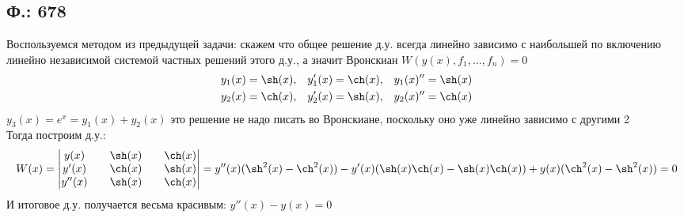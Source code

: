 \documentclass{article}
\begin{document}
\subsection{Ф.: 678}
Воспользуемся методом из предыдущей задачи: скажем что общее решение д.у. всегда линейно зависимо с наибольшей по включению линейно независимой системой частных решений этого д.у., а значит Вронскиан $W(y(x),f_1,\ldots, f_n)=0$
\begin{align*}
    &y_1(x)=\sh(x), &y_1'(x)=\ch(x), &&y_1(x)''=\sh(x) \\
    &y_2(x)=\ch(x), &y_2'(x)=\sh(x), &&y_2(x)''=\ch(x) 
\end{align*}
$y_3(x)=e^x=y_1(x)+y_2(x)$ это решение не надо писать во Вронскиане, поскольку оно уже линейно зависимо с другими 2\\
Тогда построим д.у.:
\begin{equation}
    W(x)
    =
    \begin{vmatrix}
     y(x) && \sh(x) && \ch(x)\\
     y'(x) && \ch(x) && \sh(x)\\
     y''(x) && \sh(x) && \ch(x)\\
    \end{vmatrix}
    =y''(x) (\sh^2(x)-\ch^2(x)) - y'(x) (\sh(x)\ch(x)-\sh(x)\ch(x)) + y(x) (\ch^2(x)-\sh^2(x))
    =0
\end{equation}
И итоговое д.у. получается весьма красивым: $y''(x)-y(x)=0$
\end{document}
